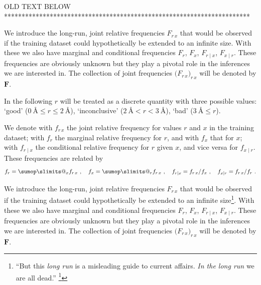 \documentclass[\ifafour a4paper,12pt,\else a5paper,10pt,\fi%
onecolumn,oneside,article,%
british%
]{memoir}
\makeatletter
\theoremstyle{remark}
\theoremstyle{innote}
\def\sum{\DOTSI\sumop\slimits@}
\newcommand*{\citep}{\footcites}
\renewcommand*{\le}{\leqslant}%
\renewcommand*{\|}[1][]{\nonscript\:#1\vert\nonscript\:\mathopen{}}
\renewcommand*{\=}{\TextOrMath\texteq\eq}
\newcommand*{\sect}{\S}%
\newcommand*{\wrench}{{\fontencoding{U}\fontfamily{fontawesomethree}\selectfont\symbol{114}}}
\newcommand{\mynote}[1]{ {\color{notecolour}#1}}
\newcommand*{\q}{}%
\DeclareRobustCommand*{\q}{%
  \mathord{\mathpalette\bigcdot@{}}%
}
\newcommand*{\bigcdot@scalefactor}{0.7}
\newcommand*{\bigcdot@widthfactor}{1.5}
\newcommand*{\bigcdot@}[2]{%
  \sbox0{$#1\vcenter{}$}%
  \sbox2{$#1\cdot\m@th$}%
  \hbox to \bigcdot@widthfactor\wd2{%
    \hfil
    \raise\ht0\hbox{%
      \scalebox{\bigcdot@scalefactor}{%
        \lower\ht0\hbox{$#1\bullet\m@th$}%
      }%
    }%
    \hfil
  }%
}
\newcommand*{\yF}{\bm{F}}
\makeatother
\begin{document}
\clearpage
\mynote{\wrench OLD TEXT BELOW}\\
**********************************************************************



We introduce the long-run, joint relative frequencies $F_{r\,x}$ that would
be observed if the training dataset could hypothetically be extended to an
infinite size. With these we also have
marginal and conditional frequencies $F_{r\q}$, $F_{\q x}$, $F_{r\mid x}$,
$F_{x \mid r}$. These frequencies are obviously unknown but they play a
pivotal role in the inferences we are interested in. The collection of
joint frequencies $\bigl(F_{r\,x}\bigr)_{r\,x}$ will be denoted by $\yF$.


In the following $r$ will be treated as a discrete quantity with three
possible values: \enquote*{good}
($0\ \textrm{\AA}\le r \le 2\ \textrm{\AA}$), \enquote*{inconclusive}
($2\ \textrm{\AA} < r < 3\ \textrm{\AA}$), \enquote*{bad}
($3\ \textrm{\AA} \le r$).

We denote with $f_{r\, x}$ the joint relative frequency for values $r$ and
$x$ in the training dataset; with $f_{r\q}$ the marginal relative frequency
for $r$, and with $f_{\q x}$ that for $x$; with $f_{r\mid x}$ the
conditional relative frequency for $r$ given $x$, and vice versa for
$f_{x \mid r}$. These frequencies are related by
\begin{equation}
  \label{eq:frequencies_relations}
  f_{r\q}=\sum_{x} f_{r\,x}\ , \quad
  f_{\q x}=\sum_{r} f_{r\,x}\ ,\quad
  f_{r\mid x}=f_{r\,x}/f_{\q x}\ , \quad
  f_{x\mid r}=f_{r\,x}/f_{r\q}\ .
\end{equation}

We introduce the long-run, joint relative frequencies $F_{r\,x}$ that would
be observed if the training dataset could hypothetically be extended to an
infinite size\footnote{\enquote{But this \emph{long run} is a misleading
    guide to current affairs. \emph{In the long run} we are all dead.}
  \citep[\sect~3.I, p.~65]{keynes1923_r2013}}. With these we also have
marginal and conditional frequencies $F_{r\q}$, $F_{\q x}$, $F_{r\mid x}$,
$F_{x \mid r}$. These frequencies are obviously unknown but they play a
pivotal role in the inferences we are interested in. The collection of
joint frequencies $\bigl(F_{r\,x}\bigr)_{r\,x}$ will be denoted by $\yF$.

\bigskip
\end{document}
